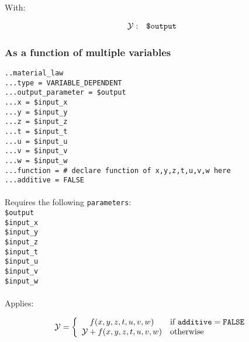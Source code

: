 \documentclass[10pt]{article}
\begin{document}
With:

\begin{eqnarray}
	\mathcal{Y} & : & \verb+$output+ \notag
\end{eqnarray}

\subsubsection{As a function of multiple variables}

\noindent \verb+..material_law+\\
\verb+...type = VARIABLE_DEPENDENT+\\
\verb+...output_parameter = $output+\\
\verb+...x = $input_x+\\
\verb+...y = $input_y+\\
\verb+...z = $input_z+\\
\verb+...t = $input_t+\\
\verb+...u = $input_u+\\
\verb+...v = $input_v+\\
\verb+...w = $input_w+\\
\verb+...function = # declare function of x,y,z,t,u,v,w here+\\
\verb+...additive = FALSE+

\paragraph{}Requires the following \verb+parameters+:\\

\noindent \verb+$output+\\
\verb+$input_x+\\
\verb+$input_y+\\
\verb+$input_z+\\
\verb+$input_t+\\
\verb+$input_u+\\
\verb+$input_v+\\
\verb+$input_w+

\paragraph{}Applies:

\begin{equation}
	\mathcal{Y} = \left\{ \begin{array}{cl} f(x,y,z,t,u,v,w) & \text{if }\verb+additive+ = \verb+FALSE+  \\ \mathcal{Y} +f(x,y,z,t,u,v,w) & \text{otherwise} \end{array} \right.
\end{equation}
\end{document}
